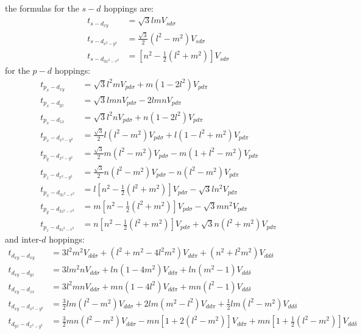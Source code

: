 the formulas for the $s-d$ hoppings are:
\begin{equation*}
\begin{split}
  t_{s-d_{xy}} &= \sqrt{3}lm V_{sd\sigma}\\
  t_{s-d_{x^2-y^2}} &= \tfrac{\sqrt{3}}{2} (l^2-m^2) V_{sd\sigma}\\
  t_{s-d_{3x^2-r^2}} &= \left[n^2-\frac{1}{2}(l^2+m^2)\right] V_{sd\sigma}
\end{split}
\end{equation*}
for the $p-d$ hoppings:
\begin{equation*}
\begin{split}
  t_{p_x-d_{xy}} &= \sqrt{3}l^2m V_{pd\sigma} + m(1-2l^2) V_{pd\pi}\\
  t_{p_x-d_{yz}} &= \sqrt{3}lmn V_{pd\sigma} - 2lmn V_{pd\pi}\\
  t_{p_x-d_{zx}} &= \sqrt{3}l^2n V_{pd\sigma} + n(1-2l^2) V_{pd\pi}\\
  t_{p_x-d_{x^2-y^2}} &= \frac{\sqrt{3}}{2}l(l^2-m^2) V_{pd\sigma} +
                         l(1-l^2+m^2) V_{pd\pi}\\
  t_{p_y-d_{x^2-y^2}} &= \tfrac{\sqrt{3}}{2}m(l^2-m^2) V_{pd\sigma} -
                         m(1+l^2-m^2) V_{pd\pi}\\
  t_{p_z-d_{x^2-y^2}} &= \tfrac{\sqrt{3}}{2}n(l^2-m^2) V_{pd\sigma} -
                         n(l^2-m^2) V_{pd\pi}\\
  t_{p_x-d_{3z^2-r^2}} &= l\left[n^2-\tfrac{1}{2}(l^2+m^2)\right] V_{pd\sigma}-
                          \sqrt{3}ln^2 V_{pd\pi}\\
  t_{p_y-d_{3z^2-r^2}} &= m\left[n^2-\tfrac{1}{2}(l^2+m^2)\right] V_{pd\sigma}-
                          \sqrt{3}mn^2 V_{pd\pi}\\
  t_{p_z-d_{3z^2-r^2}} &= n\left[n^2-\tfrac{1}{2}(l^2+m^2)\right] V_{pd\sigma}+
                          \sqrt{3}n(l^2+m^2) V_{pd\pi}
\end{split}
\end{equation*}
and inter-$d$ hoppings:
\begin{equation*}
\begin{split}
  t_{d_{xy}-d_{xy}} &= 3l^2m^2 V_{dd\sigma} + (l^2 + m^2 - 4l^2m^2) V_{dd\pi}+
                       (n^2+l^2m^2) V_{dd\delta}\\
  t_{d_{xy}-d_{yz}} &= 3lm^2n V_{dd\sigma} + ln(1-4m^2) V_{dd\pi}+
                       ln(m^2-1) V_{dd\delta}\\
  t_{d_{xy}-d_{zx}} &= 3l^2mn V_{dd\sigma} + mn(1-4l^2) V_{dd\pi}+
                       mn(l^2-1) V_{dd\delta}\\
  t_{d_{xy}-d_{x^2-y^2}} &= \tfrac{3}{2}lm(l^2-m^2) V_{dd\sigma} +
                            2lm(m^2-l^2) V_{dd\pi}+
                            \tfrac{1}{2}lm(l^2-m^2) V_{dd\delta}\\
  t_{d_{yz}-d_{x^2-y^2}} &= \tfrac{3}{2}mn(l^2-m^2) V_{dd\sigma} -
                            mn\left[1+2(l^2-m^2)\right]V_{dd\pi}+
                            mn\left[1+\tfrac{1}{2}(l^2-m^2)\right] V_{dd\delta}
\end{split}  %
\end{equation*}


